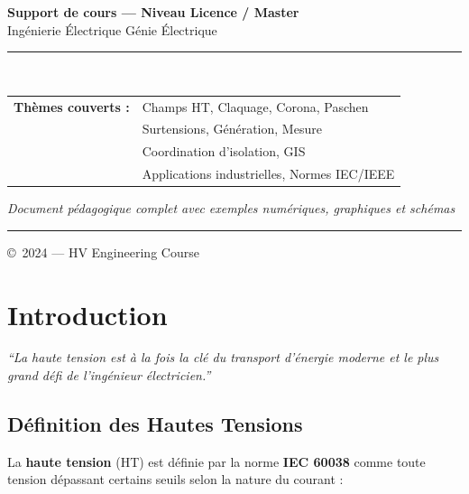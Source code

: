 \documentclass[12pt, a4paper, twoside]{report}
\begin{document}
\begin{titlepage}
\vspace{0.6cm}
\begin{tcolorbox}[
  colback=midblue!80, colframe=lightblue, arc=6pt,
  width=0.85\textwidth, boxrule=1pt
]
\centering
\color{white}
\textbf{\large Support de cours — Niveau Licence / Master}\\[4pt]
Ingénierie Électrique \textbullet{} Génie Électrique\\[8pt]
\textcolor{accent}{\rule{0.5\textwidth}{0.5pt}}\\[8pt]
{\small
\begin{tabular}{ll}
  \textbf{Thèmes couverts :} & Champs HT, Claquage, Corona, Paschen\\
  & Surtensions, Génération, Mesure\\
  & Coordination d'isolation, GIS\\
  & Applications industrielles, Normes IEC/IEEE
\end{tabular}
}
\end{tcolorbox}

\vfill
{\color{lightblue!70}\small\textit{Document pédagogique complet avec exemples numériques, graphiques et schémas}}\\[4pt]
{\color{accent}\rule{\textwidth}{1pt}}
{\color{textmed!50}\small\copyright~2024 — HV Engineering Course}
\end{titlepage}

\tableofcontents
\clearpage

\chapter{Introduction}

\epigraph{\textit{``La haute tension est à la fois la clé du transport d'énergie moderne et
le plus grand défi de l'ingénieur électricien.''}}{}

\section{Définition des Hautes Tensions}

La \textbf{haute tension} (HT) est définie par la norme \textbf{IEC 60038} comme toute
tension dépassant certains seuils selon la nature du courant :
\end{document}
